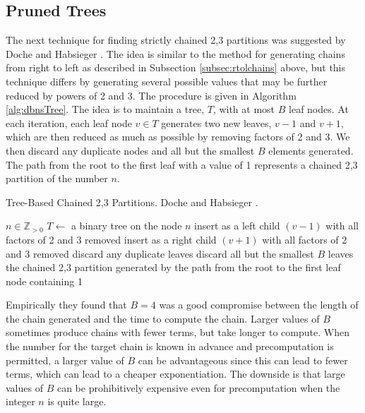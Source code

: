 \documentclass{ucalgthes1}
\theoremstyle{definition}
\newcommand{\ZZgtz}{\mathbb{Z}_{>0}}
\begin{document}
\bigbreak
\subsection{Pruned Trees}

The next technique for finding strictly chained 2,3 partitions was suggested by Doche and Habsieger \cite{Doche2008}. The idea is similar to the method for generating chains from right to left as described in Subsection \ref{subsec:rtolchains} above, but this technique differs by generating several possible values that may be further reduced by powers of 2 and 3. The procedure is given in Algorithm \ref{alg:dbnsTree}.  The idea is to maintain a tree, $T$, with at most $B$ leaf nodes. At each iteration, each leaf node $v \in T$ generates two new leaves, $v-1$ and $v+1$, which are then reduced as much as possible by removing factors of 2 and 3.  We then discard any duplicate nodes and all but the smallest $B$ elements generated. The path from the root to the first leaf with a value of 1 represents a chained 2,3 partition of the number $n$.

\begin{algorithm}[h]
\caption{Tree-Based Chained 2,3 Partitions. Doche and Habsieger \cite{Doche2008}.}
\label{alg:dbnsTree}
\begin{algorithmic}[1]
\REQUIRE $n \in \ZZgtz$
\STATE $T \gets$ a binary tree on the node $n$
		\STATE insert as a left child $(v - 1)$ with all factors of 2 and 3 removed
		\STATE insert as a right child $(v + 1)$ with all factors of 2 and 3 removed
	\ENDFOR
	\STATE discard any duplicate leaves
	\STATE discard all but the smallest $B$ leaves
\ENDWHILE
\RETURN the chained 2,3 partition generated by the path from the root to the first leaf node containing 1
\end{algorithmic}
\end{algorithm}

Empirically they found that $B=4$ was a good compromise between the length of the chain generated and the time to compute the chain. Larger values of $B$ sometimes produce chains with fewer terms, but take longer to compute. When the number for the target chain is known in advance and precomputation is permitted, a larger value of $B$ can be advantageous since this can lead to fewer terms, which can lead to a cheaper exponentiation.  The downside is that large values of $B$ can be prohibitively expensive even for precomputation when the integer $n$ is quite large.
\end{document}
